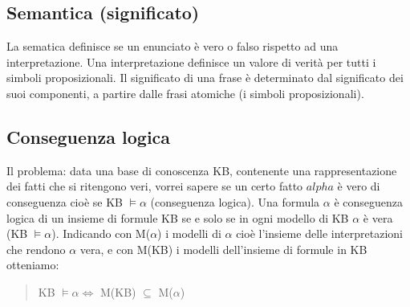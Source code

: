 \documentclass{article}
\begin{document}
\subsection{Semantica (significato)}
La sematica definisce se un enunciato è vero o falso rispetto ad una interpretazione. Una interpretazione definisce un valore di verità per tutti i simboli proposizionali. Il significato di una frase è determinato dal significato dei suoi componenti, a partire dalle frasi atomiche (i simboli proposizionali). 

\subsection{Conseguenza logica}
Il problema: data una base di conoscenza KB, contenente una rappresentazione dei fatti che si ritengono veri, vorrei sapere se un certo fatto $alpha$ è vero di conseguenza cioè se KB $\models \alpha$ (conseguenza logica).
Una formula $\alpha$ è conseguenza logica di un insieme di formule KB se e solo se in ogni modello di KB $\alpha$ è vera (KB $\models \alpha$). \newline Indicando con M($\alpha$) i modelli di $\alpha$ cioè l’insieme delle interpretazioni che rendono $\alpha$ vera, e con M(KB) i modelli dell’insieme di formule in KB otteniamo:
\begin{quote}
    KB $\models \alpha \Leftrightarrow$ M(KB) $\subseteq$ M($\alpha$)
\end{quote}
\end{document}
